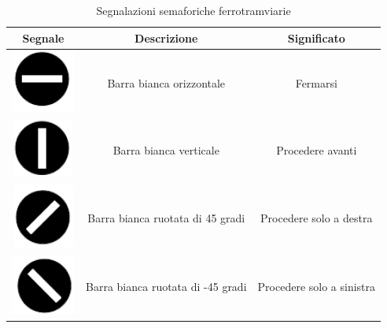 \begin{table}
\begin{tabular}{|c|c|c|}
	\hline 
	\textbf{Segnale} & \textbf{Descrizione} & \textbf{Significato} \\

	\hline
	\includegraphics{img/stopsemaphore}& Barra bianca orizzontale & Fermarsi \\ 
	\hline 
	\includegraphics{img/gosemaphore}& Barra bianca verticale  & Procedere avanti \\ 
	\hline 
	\includegraphics{img/rightsemaphore}& Barra bianca ruotata di 45 gradi & Procedere solo a destra \\ 
	\hline 
	\includegraphics{img/leftsemaphore}& Barra bianca ruotata di -45 gradi & Procedere solo a sinistra \\ 
	\hline 
\end{tabular} 
\caption{Segnalazioni semaforiche ferrotramviarie}
\label{tab:sem}
\end{table}
